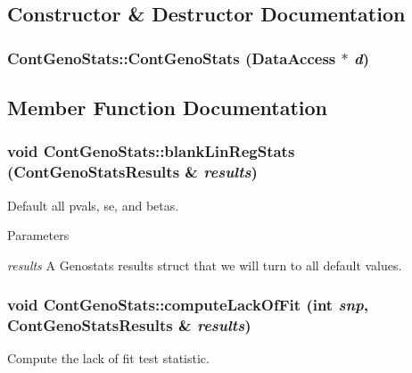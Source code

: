 \subsection{Constructor \& Destructor Documentation}
\hypertarget{classContGenoStats_a63e8c1b4f83723b05dfc7be462b438dc}{
\subsubsection[{ContGenoStats}]{\setlength{\rightskip}{0pt plus 5cm}ContGenoStats::ContGenoStats ({\bf DataAccess} $\ast$ {\em d})}}
\label{classContGenoStats_a63e8c1b4f83723b05dfc7be462b438dc}


\subsection{Member Function Documentation}
\hypertarget{classContGenoStats_abd30393de9c715bf4613f917130617ef}{
\subsubsection[{blankLinRegStats}]{\setlength{\rightskip}{0pt plus 5cm}void ContGenoStats::blankLinRegStats ({\bf ContGenoStatsResults} \& {\em results})}}
\label{classContGenoStats_abd30393de9c715bf4613f917130617ef}
Default all pvals, se, and betas.


\begin{DoxyParams}{Parameters}
\item[{\em results}]A Genostats results struct that we will turn to all default values. \end{DoxyParams}
\hypertarget{classContGenoStats_a19a72ee3254feaf596fde9b4f0446647}{
\subsubsection[{computeLackOfFit}]{\setlength{\rightskip}{0pt plus 5cm}void ContGenoStats::computeLackOfFit (int {\em snp}, \/  {\bf ContGenoStatsResults} \& {\em results})}}
\label{classContGenoStats_a19a72ee3254feaf596fde9b4f0446647}
Compute the lack of fit test statistic.


